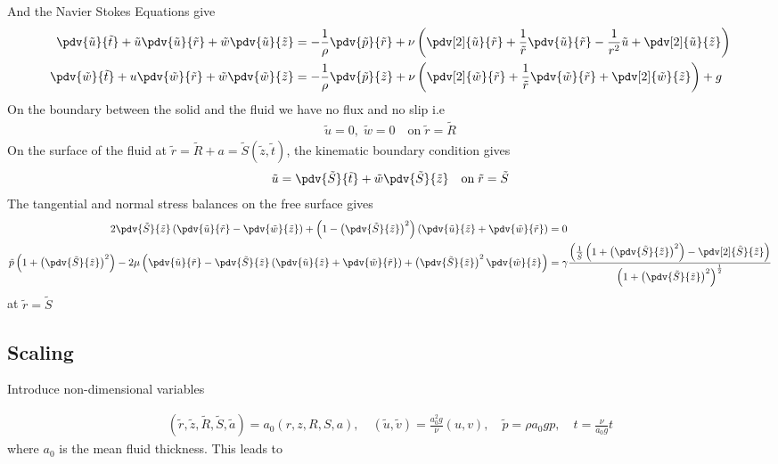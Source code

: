 \documentclass[12pt]{article}
\begin{document}
And the Navier Stokes Equations give
\begin{align}
\pdv{\tilde u}{\tilde t}+\tilde u\pdv{\tilde u}{\tilde r}+\tilde w\pdv{\tilde u}{\tilde z}&=-\frac{1}{\rho}\pdv{\tilde p}{\tilde r}+\nu\left(\pdv[2]{\tilde u}{\tilde r}+\frac{1}{\tilde r}\pdv{\tilde u}{\tilde r}-\frac{1}{r^2}\tilde u+\pdv[2]{\tilde u}{\tilde z}\right)\label{navierr}\\
\pdv{\tilde w}{\tilde t}+u\pdv{\tilde w}{\tilde r}+\tilde w\pdv{\tilde w}{\tilde z}&=-\frac{1}{\rho}\pdv{\tilde p}{\tilde z}+\nu\left(\pdv[2]{\tilde w}{\tilde r}+\frac{1}{\tilde r}\pdv{\tilde w}{\tilde r}+\pdv[2]{\tilde w}{\tilde z}\right) + g \label{navierv}
\end{align}
On the boundary between the solid and the fluid we have no flux and no slip i.e
\begin{align}
\tilde u=0,\;\tilde  w=0\quad\mathrm{on}\; \tilde r=\tilde R \label{solidboundary}
\end{align}
On the surface of the fluid at $\tilde r=\tilde R+a=\tilde S(\tilde z,\tilde t)$, the kinematic boundary condition gives
\begin{align}
\tilde   u=\pdv{\tilde S}{\tilde t}+\tilde w\pdv{\tilde S}{\tilde z} \quad\mathrm{on}\;\tilde  r=\tilde S \label{kinematic}
\end{align}
The tangential and normal stress balances on the free surface gives
\footnotesize
\begin{align}
2\pdv{\tilde S}{\tilde z}\left(\pdv{\tilde u}{\tilde r}-\pdv{\tilde w}{\tilde z}\right)+\left(1-\left(\pdv{\tilde S}{\tilde z}\right)^2\right)\left(\pdv{\tilde u}{\tilde z}+\pdv{\tilde w}{\tilde r}\right)&=0\label{tangstress}\\
\tilde p\left(1+\left(\pdv{\tilde S}{\tilde z}\right)^2\right)-2\mu\left( \pdv{\tilde u}{\tilde r}-\pdv{\tilde S}{\tilde z}\left(\pdv{\tilde u}{\tilde z}+\pdv{\tilde w}{\tilde r}\right)+\left(\pdv{\tilde S}{\tilde z}\right)^2\pdv{\tilde w}{\tilde z}\right)&=\gamma\frac{\left(\frac{1}{\tilde S}\left(1+\left(\pdv{\tilde S}{\tilde z}\right)^2\right)-\pdv[2]{\tilde S}{\tilde z}\right)}{\left(1+\left(\pdv{\tilde S}{\tilde z}\right)^2\right)^{\frac{1}{2}}}\label{normstress}
\end{align}
\normalsize
at $\tilde r= \tilde{S}$
\subsection{Scaling}
Introduce non-dimensional variables

\begin{align}
(\tilde{r},\tilde{z},\tilde{R}, \tilde{S}, \tilde{a}) = a_0(r,z,R,S,a),\quad (\tilde{u},\tilde{v}) = \frac{a_0^2  g}{\nu}(u,v),\quad \tilde p=\rho  a_0g  p, \quad t=\frac{\nu}{a_0g}t
\end{align}
where $a_0$ is the mean fluid thickness.
This leads to 
\end{document}
